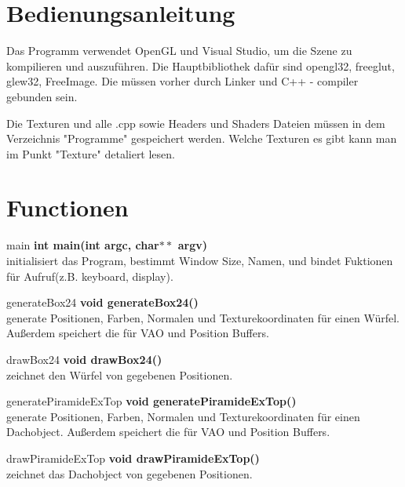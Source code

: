 \documentclass[12pt]{article}
\begin{document}
\pagebreak
\section{Bedienungsanleitung}
Das Programm verwendet OpenGL und Visual Studio, um die Szene zu kompilieren und auszuführen. Die Hauptbibliothek dafür sind opengl32, freeglut, glew32, FreeImage. Die müssen vorher durch Linker und C++ - compiler gebunden sein.

\bigbreak



\bigbreak

Die Texturen und alle .cpp sowie Headers und Shaders Dateien müssen in dem Verzeichnis "Programme" gespeichert werden. Welche Texturen es gibt kann man im Punkt "Texture" detaliert lesen.

\section{Functionen}
\begin{mybox}[colback=lightgray]{main}
\textbf{int main(int argc, char$**$ argv)} \\
initialisiert das Program, bestimmt Window Size, Namen, und bindet Fuktionen für Aufruf(z.B. keyboard, display).
\end{mybox}

\begin{mybox}[colback=white]{generateBox24}
\textbf{void generateBox24()} \\
generate Positionen, Farben, Normalen und Texturekoordinaten für einen Würfel. 
Außerdem speichert die für VAO und Position Buffers.
\end{mybox}
\begin{mybox}[colback=white]{drawBox24}
\textbf{void drawBox24()} \\
zeichnet den Würfel von gegebenen Positionen.
\end{mybox}

\begin{mybox}[colback=white]{generatePiramideExTop}
\textbf{void generatePiramideExTop()} \\
generate Positionen, Farben, Normalen und Texturekoordinaten für einen Dachobject. 
Außerdem speichert die für VAO und Position Buffers.
\end{mybox}
\begin{mybox}[colback=white]{drawPiramideExTop}
\textbf{void drawPiramideExTop()} \\
zeichnet das Dachobject von gegebenen Positionen.
\end{mybox}
\end{document}
